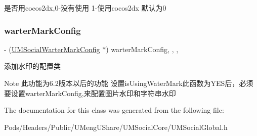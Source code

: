 是否用cocos2dx,0-\/没有使用 1-\/使用cocos2dx 默认为0 \mbox{\label{interface_u_m_social_global_acda7c70bf79b614501c0a69f01f7a298}} 
\subsubsection{\texorpdfstring{warter\+Mark\+Config}{warterMarkConfig}}
{\footnotesize\ttfamily -\/ (\mbox{\hyperlink{interface_u_m_social_warter_mark_config}{U\+M\+Social\+Warter\+Mark\+Config}} $\ast$) warter\+Mark\+Config\hspace{0.3cm}{\ttfamily [read]}, {\ttfamily [write]}, {\ttfamily [nonatomic]}, {\ttfamily [strong]}}

添加水印的配置类 \begin{DoxyNote}{Note}
此功能为6.2版本以后的功能  设置is\+Using\+Water\+Mark此函数为\+Y\+E\+S后，必须要设置warter\+Mark\+Config,来配置图片水印和字符串水印 
\end{DoxyNote}


The documentation for this class was generated from the following file\+:\begin{DoxyCompactItemize}
\item 
Pods/\+Headers/\+Public/\+U\+Meng\+U\+Share/\+U\+M\+Social\+Core/U\+M\+Social\+Global.\+h\end{DoxyCompactItemize}
